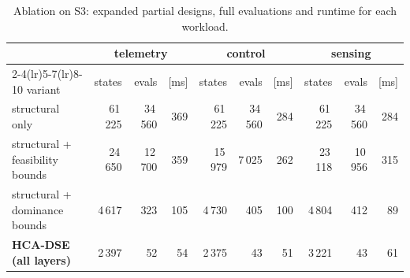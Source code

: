 \documentclass[pdflatex,sn-nature]{sn-jnl}
\theoremstyle{thmstyleone}
\theoremstyle{thmstyletwo}
\theoremstyle{thmstylethree}
\begin{document}
\begin{table}[!htbp]\centering
\caption{Ablation on S3: expanded partial designs, full evaluations and runtime for each
workload.}\label{tabS6}
{\let\scriptsize\tiny\setlength{\tabcolsep}{2pt}\scriptsize
\setlength{\tabcolsep}{3.5pt}
\begin{tabular}{lrrrrrrrrr}
\toprule
& \multicolumn{3}{c}{telemetry} & \multicolumn{3}{c}{control} & \multicolumn{3}{c}{sensing} \\
\cmidrule(lr){2-4}\cmidrule(lr){5-7}\cmidrule(lr){8-10}
variant & states & evals & [ms] & states & evals & [ms] & states & evals & [ms] \\
\midrule
structural only & 61\,225 & 34\,560 & 369 & 61\,225 & 34\,560 & 284 & 61\,225 & 34\,560 & 284 \\
structural + feasibility bounds & 24\,650 & 12\,700 & 359 & 15\,979 & 7\,025 & 262 & 23\,118 & 10\,956 & 315 \\
structural + dominance bounds & 4\,617 & 323 & 105 & 4\,730 & 405 & 100 & 4\,804 & 412 & 89 \\
\textbf{HCA-DSE (all layers)} & 2\,397 & 52 & 54 & 2\,375 & 43 & 51 & 3\,221 & 43 & 61 \\
\bottomrule
\end{tabular}}
\end{table}
\end{document}
